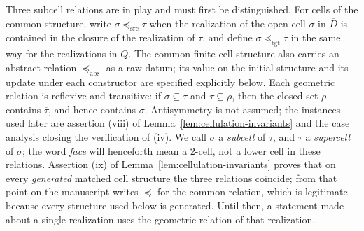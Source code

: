 \documentclass[11pt]{article}
\theoremstyle{mainplain}
\theoremstyle{mainroman}
\theoremstyle{definition}
\numberwithin{equation}{section}
\begin{document}
Three subcell relations are in play and must first be distinguished.
For cells of the common structure, write
\(\sigma\preceq_{\mathrm{src}}\tau\) when the realization of the open
cell \(\sigma\) in \(\overline D\) is contained in the closure of the
realization of \(\tau\), and define \(\sigma\preceq_{\mathrm{tgt}}\tau\)
in the same way for the realizations in \(Q\). The common finite cell
structure also carries an abstract relation
\(\preceq_{\mathrm{abs}}\) as a raw datum; its value on the initial
structure and its update under each constructor are specified
explicitly below. Each geometric relation is reflexive and transitive:
if \(\sigma\subseteq\overline\tau\) and
\(\tau\subseteq\overline\rho\), then the closed set \(\overline\rho\)
contains \(\overline\tau\), and hence contains \(\sigma\).
Antisymmetry is not assumed; the instances used later are assertion
\textup{(viii)} of Lemma~\ref{lem:cellulation-invariants} and the case
analysis closing the verification of \textup{(iv)}. We call
\(\sigma\) a \emph{subcell} of \(\tau\), and \(\tau\) a
\emph{supercell} of \(\sigma\); the word \emph{face} will henceforth
mean a 2-cell, not a lower cell in these relations. Assertion
\textup{(ix)} of Lemma~\ref{lem:cellulation-invariants} proves that on
every \emph{generated} matched cell structure the three relations
coincide; from that point on the manuscript writes \(\preceq\) for the
common relation, which is legitimate because every structure used
below is generated. Until then, a statement made about a single
realization uses the geometric relation of that realization.
\end{document}
